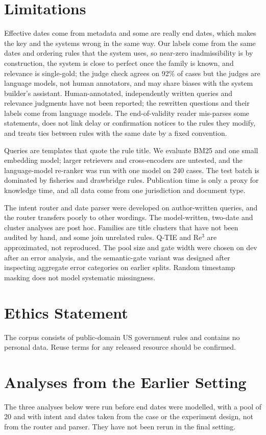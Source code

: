 \documentclass[11pt]{article}
\begin{document}
\section{Limitations}
Effective dates come from metadata and some are really end dates, which makes the key and the systems wrong in the same way. Our labels come from the same dates and ordering rules that the system uses, so near-zero inadmissibility is by construction, the system is close to perfect once the family is known, and relevance is single-gold; the judge check agrees on 92\% of cases but the judges are language models, not human annotators, and may share biases with the system builder's assistant. Human-annotated, independently written queries and relevance judgments have not been reported; the rewritten questions and their labels come from language models. The end-of-validity reader mis-parses some statements, does not link delay or confirmation notices to the rules they modify, and treats ties between rules with the same date by a fixed convention.

Queries are templates that quote the rule title. We evaluate BM25 and one small embedding model; larger retrievers and cross-encoders are untested, and the language-model re-ranker was run with one model on 240 cases. The test batch is dominated by fisheries and drawbridge rules. Publication time is only a proxy for knowledge time, and all data come from one jurisdiction and document type.

The intent router and date parser were developed on author-written queries, and the router transfers poorly to other wordings. The model-written, two-date and cluster analyses are post hoc. Families are title clusters that have not been audited by hand, and some join unrelated rules. Q-TIE and Re$^3$ are approximated, not reproduced. The pool size and gate width were chosen on dev after an error analysis, and the semantic-gate variant was designed after inspecting aggregate error categories on earlier splits. Random timestamp masking does not model systematic missingness.

\section*{Ethics Statement}
The corpus consists of public-domain US government rules and contains no personal data. Reuse terms for any released resource should be confirmed.



\appendix
\section{Analyses from the Earlier Setting}
The three analyses below were run before end dates were modelled, with a pool of 20 and with intent and dates taken from the case or the experiment design, not from the router and parser. They have not been rerun in the final setting.
\end{document}
